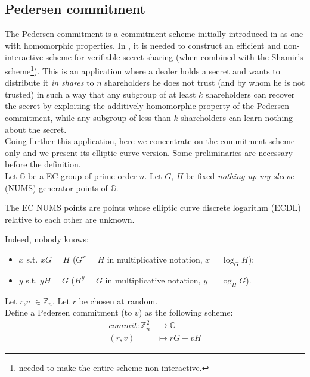 \subsection{Pedersen commitment}
\label{subsec_PC}
The Pedersen commitment is a commitment scheme initially introduced in \cite{Pedersen} as one with homomorphic properties. In \cite{Pedersen}, it is needed to construct an efficient and non-interactive scheme for verifiable secret sharing (when combined with the Shamir's scheme\footnote{needed to make the entire scheme non-interactive.}). This is an application where a dealer holds a secret and wants to distribute it \textit{in shares} to $n$ shareholders he does not trust (and by whom he is not trusted) in such a way that any subgroup of at least $k$ shareholders can recover the secret by exploiting the additively homomorphic property of the Pedersen commitment, while any subgroup of less than $k$ shareholders can learn nothing about the secret.\\
Going further this application, here we concentrate on the commitment scheme only and we present its elliptic curve version. Some preliminaries are necessary before the definition.\\
Let $\mathbb{G}$ be a EC group of prime order $n$. Let $G$, $H$ be fixed \textit{nothing-up-my-sleeve} (NUMS) generator points of $\mathbb{G}$.
\begin{mydef}
    The EC NUMS points are points whose elliptic curve discrete logarithm (ECDL) relative to each other are unknown.
\end{mydef}
\begin{myrem}
    Indeed, nobody knows: \begin{itemize}
        \item $x$ s.t. $xG = H$ ($G^x = H$ in multiplicative notation, $x=\log_GH$);
        \item $y$ s.t. $yH = G$ ($H^y = G$ in multiplicative notation, $y=\log_HG$).
    \end{itemize}
\end{myrem}
\begin{mydef}
\label{Pedersen_commitment}
    Let $r$,$v$ $\in \mathbb{Z}_n$. Let $r$ be chosen at random.\\ Define a Pedersen commitment (to $v$) as the following scheme: \begin{align*}
        commit \colon \mathbb{Z}_n^2 &\to \mathbb{G}\\
        (r,v) &\mapsto rG + vH
        \end{align*}
\end{mydef}
